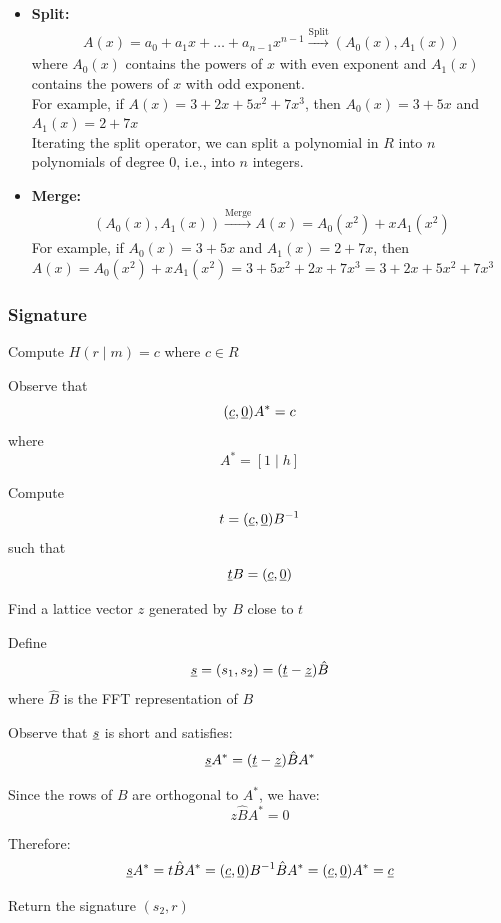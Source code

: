 \begin{itemize}
    \item \textbf{Split:} 
        \begin{align*}
            A(x) = a_0 + a_1 x + \ldots + a_{n-1} x^{n-1} \xrightarrow{\text{Split}} (A_0(x), A_1(x))
        \end{align*}
        where $A_0(x)$ contains the powers of $x$ with even exponent and $A_1(x)$ contains the powers of $x$ with odd exponent.\\
        For example, if $A(x) = 3 + 2x + 5x^2 + 7x^3$, then $A_0(x) = 3 + 5x$ and $A_1(x) = 2 + 7x$\\
        Iterating the split operator, we can split a polynomial in $R$ into $n$ polynomials of degree 0, i.e., into $n$ integers.

    \item \textbf{Merge:}
        \begin{align*}
            (A_0(x), A_1(x)) \xrightarrow{\text{Merge}} A(x) = A_0(x^2) + x A_1(x^2)
        \end{align*}
        For example, if $A_0(x) = 3 + 5x$ and $A_1(x) = 2 + 7x$, then $A(x) = A_0(x^2) + x A_1(x^2) = 3 + 5x^2 + 2x + 7x^3 = 3 +        2x + 5x^2 + 7x^3$
\end{itemize}

\subsubsection*{Signature}

\begin{algorithm}
\begin{algorithmic}[1]

    \State Compute $H(r \mid m) = c$ where $c \in R$

    \State Observe that
    \[
        (\underline{c},\underline{0})A^* = c
    \]
    where
    \[
        A^* = [1 \mid h]
    \]

    \State Compute
    \[
        t = (\underline{c},\underline{0})B^{-1}
    \]
    such that
    \[
        \underline{t}B = (\underline{c},\underline{0})
    \]

    \State Find a lattice vector $z$ generated by $B$ close to $t$
    
    \State Define
    \[
        \underline{s} = (s_1,s_2) = (\underline{t}-\underline{z})\hat{B}
    \]
    where $\hat{B}$ is the FFT representation of $B$

    \State Observe that $\underline{s}$ is short and satisfies:
    \[
        \underline{s}A^*
        =
        (\underline{t}-\underline{z})\hat{B}A^*
    \]

    \State Since the rows of $B$ are orthogonal to $A^*$, we have:
    \[
        z\hat{B}A^* = 0
    \]

    \State Therefore:
    \[
        \underline{s}A^*
        =
        t\hat{B}A^*
        =
        (\underline{c},\underline{0})B^{-1}\hat{B}A^*
        =
        (\underline{c},\underline{0})A^*
        =
        \underline{c}
    \]

    \State Return the signature $(s_2,r)$

\end{algorithmic}
\end{algorithm}

